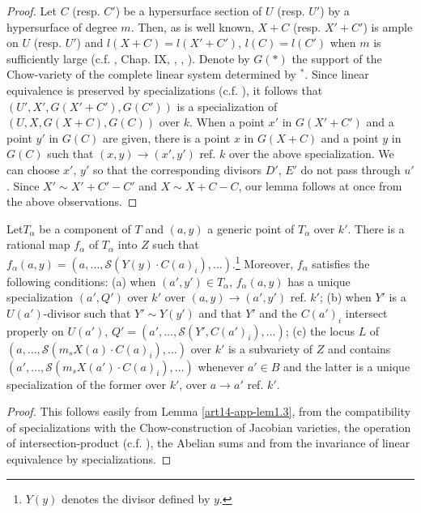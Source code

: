 \begin{proof}
Let $C$ (resp. $C'$) be a hypersurface section of $U$ (resp. $U'$) by a hypersurface of degree $m$. Then, as is well known, $X+C$ (resp. $X'+C'$) is ample on $U$ (resp. $U'$) and $l(X+C)=l(X'+C')$, $l(C)=l(C')$ when $m$ is sufficiently large (c.f. \cite{art14-key25}, Chap. IX, \cite{art14-key31}, \cite{art14-key21}, \cite{art14-key4}). Denote by $G(*)$ the support of the Chow-variety of the complete linear system determined by $^{*}$. Since linear equivalence is preserved by specializations (c.f. \cite{art14-key24}), it follows that $(U',X',G(X'+C'),G(C'))$ is a specialization of $(U,X,G(X+C),G(C))$ over $k$. When a point $x'$ in $G(X'+C')$ and a point $y'$ in $G(C)$ are given, there is a point $x$ in $G(X+C)$ and a point $y$ in $G(C)$ such that $(x,y)\to (x',y')$ ref. $k$ over the above specialization. We can choose $x'$, $y'$ so that the corresponding divisors $D'$, $E'$ do not pass through $u'$. Since $X'\sim X'+C'-C'$ and $X\sim X+C-C$, our lemma follows at once from the above observations. 
\end{proof}

\begin{coro*}
Let\pageoriginale $T_{\alpha}$ be a component of $T$ and $(a,y)$ a generic point of $T_{\alpha}$ over $k'$. There is a rational map $f_{\alpha}$ of $T_{\alpha}$ into $Z$ such that $f_{\alpha}(a,y)=(a,\ldots,\mathscr{S}(Y(y)\cdot C(a)_{i}),\ldots)$.\footnote{$Y(y)$ denotes the divisor defined by $y$.} Moreover, $f_{\alpha}$ satisfies the following conditions: {\rm(a)} when $(a',y')\in T_{\alpha}$, $f_{\alpha}(a,y)$ has a unique specialization $(a',Q')$ over $k'$ over $(a,y)\to (a',y')$ ref. $k'$; {\rm(b)} when $Y'$ is a $U(a')$-divisor such that $Y'\sim Y(y')$ and that $Y'$ and the $C(a')_{i}$ intersect properly on $U(a')$, $Q'=(a',\ldots,\mathscr{S}(Y',C(a')_{i}),\ldots)$; {\rm(c)} the locus $L$ of $(a,\ldots,\mathscr{S}(m_{s}X(a)\cdot C(a)_{i}),\ldots)$ over $k'$ is a subvariety of $Z$ and contains $(a',\ldots,\mathscr{S}(m_{s}X(a')\cdot C(a)_{i}),\ldots)$ whenever $a'\in B$ and the latter is a unique specialization of the former over $k'$, over $a\to a'$ {\rm ref.} $k'$.
\end{coro*}

\begin{proof}
This follows easily from Lemma \ref{art14-app-lem1.3}, from the compatibility of specializations with the Chow-construction of Jacobian varieties, the operation of intersection-product (c.f. \cite{art14-key24}), the Abelian sums and from the invariance of linear equivalence by specializations.
\end{proof}

